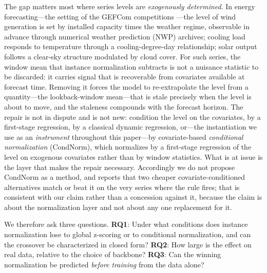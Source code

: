 The gap matters most where series levels are \emph{exogenously determined}. In energy forecasting---the setting of the GEFCom competitions \citep{hong2016gefcom}---the level of wind generation is set by installed capacity times the weather regime, observable in advance through numerical weather prediction (NWP) archives; cooling load responds to temperature through a cooling-degree-day relationship; solar output follows a clear-sky structure modulated by cloud cover. For such series, the window mean that instance normalization subtracts is not a nuisance statistic to be discarded: it carries signal that is recoverable from covariates available at forecast time. Removing it forces the model to re-extrapolate the level from a quantity---the lookback-window mean---that is stale precisely when the level is about to move, and the staleness compounds with the forecast horizon. The repair is not in dispute and is not new: condition the level on the covariates, by a first-stage regression, by a classical dynamic regression, or---the instantiation we use as an \emph{instrument} throughout this paper---by covariate-based \emph{conditional normalization} (CondNorm), which normalizes by a first-stage regression of the level on exogenous covariates rather than by window statistics. What is at issue is the layer that makes the repair necessary. Accordingly we do not propose CondNorm as a method, and  reports that two cheaper covariate-conditioned alternatives match or beat it on the very series where the rule fires; that is consistent with our claim rather than a concession against it, because the claim is about the normalization layer and not about any one replacement for it.

We therefore ask three questions. \textbf{RQ1}: Under what conditions does instance normalization lose to global z-scoring or to conditional normalization, and can the crossover be characterized in closed form? \textbf{RQ2}: How large is the effect on real data, relative to the choice of backbone? \textbf{RQ3}: Can the winning normalization be predicted \emph{before training} from the data alone?

